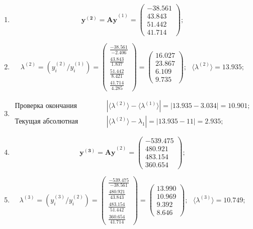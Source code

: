 \begin{enumerate}
\item $$
    \mathbf{y^{(2)} =Ay}^{(1)} = \begin{pmatrix}-38.561\\43.843\\51.442\\41.714\end{pmatrix};$$

\item $$
    \lambda^{(2)} =\left( y^{(2)}_i / y^{(1)}_i \right) =
    \begin{pmatrix} \frac{-38.561}{-2.406}\\\frac{43.843}{1.837}\\\frac{51.442}{8.421}\\\frac{41.714}{4.285}\end{pmatrix}=
    \begin{pmatrix}16.027\\23.867\\6.109\\9.735\end{pmatrix}; ~~~
    \langle\lambda^{(2)}\rangle = 13.935;$$

\item $$
    \begin{matrix}
        \text{Проверка окончания алгоритма: }&|\langle\lambda^{(2)}\rangle - \langle\lambda^{(1)}\rangle| = |13.935- 3.034| = \mathbf{10.901};\\
        \text{Текущая абсолютная ошибка: }&|\langle\lambda^{(2)}\rangle - \lambda_1| = |13.935 - 11| = \mathbf{2.935};
    \end{matrix}$$



\item $$
    \mathbf{y^{(3)} =Ay}^{(2)} = \begin{pmatrix}-539.475\\480.921\\483.154\\360.654\end{pmatrix};$$

\item $$
    \lambda^{(3)} =\left( y^{(3)}_i / y^{(2)}_i \right) =
    \begin{pmatrix} \frac{-539.475}{-38.561}\\\frac{480.921}{43.843}\\\frac{483.154}{51.442}\\\frac{360.654}{41.714}\end{pmatrix}=
    \begin{pmatrix}13.990\\10.969\\9.392\\8.646\end{pmatrix}; ~~~
    \langle\lambda^{(3)}\rangle = 10.749;$$


\end{enumerate}
